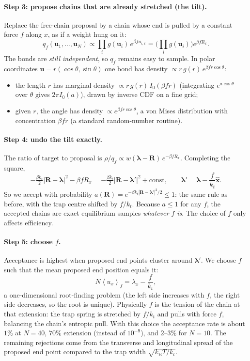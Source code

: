\documentclass[11pt,a4paper]{article}
\newcommand{\kT}{k_{\mathrm B}T}
\newcommand{\avg}[1]{\left\langle #1\right\rangle}
\newcommand{\lam}{\bm{\lambda}}
\begin{document}
\paragraph{Step 3: propose chains that are already stretched (the tilt).} Replace the free-chain proposal by a
chain whose end is pulled by a constant force $f$ along $x$, as if a weight hung on it:
\begin{equation}
q_f(\bm u_1,\dots,\bm u_N)\propto\prod_ig(\bm u_i)\,e^{\beta f u_{i,x}}=\Big(\prod_ig(\bm u_i)\Big)e^{\beta fR_x}.
\end{equation}
The bonds are \emph{still independent}, so $q_f$ remains easy to sample. In polar coordinates
$\bm u=r(\cos\theta,\sin\theta)$ one bond has density $\propto r\,g(r)\,e^{\beta fr\cos\theta}$:
\begin{itemize}[leftmargin=*,itemsep=0pt]
\item the length $r$ has marginal density $\propto r\,g(r)\,I_0(\beta fr)$ (integrating $e^{a\cos\theta}$ over
$\theta$ gives $2\pi I_0(a)$), drawn by inverse CDF on a fine grid;
\item given $r$, the angle has density $\propto e^{\beta fr\cos\theta}$, a von Mises distribution with
concentration $\beta fr$ (a standard random-number routine).
\end{itemize}

\paragraph{Step 4: undo the tilt exactly.} The ratio of target to proposal is
$\rho/q_f\propto w(\lam-\bm R)\,e^{-\beta fR_x}$. Completing the square,
\begin{equation}
-\tfrac{\beta k_t}{2}|\bm R-\lam|^2-\beta fR_x=-\tfrac{\beta k_t}{2}|\bm R-\lam'|^2+\text{const},
\qquad\lam'=\lam-\frac{f}{k_t}\hat{\bm x}.
\end{equation}
So we accept with probability $a(\bm R)=e^{-\beta k_t|\bm R-\lam'|^2/2}\le1$: the same rule as before, with the
trap centre shifted by $f/k_t$. Because $a\le1$ for any $f$, the accepted chains are exact
equilibrium samples \emph{whatever $f$ is}. The choice of $f$ only affects efficiency.

\paragraph{Step 5: choose $f$.} Acceptance is highest when proposed end points cluster around $\lam'$.
We choose $f$ such that the mean proposed end position equals it:
\begin{equation}
N\avg{u_x}_f=\lambda_x-\frac{f}{k_t},
\end{equation}
a one-dimensional root-finding problem (the left side increases with $f$, the right side decreases,
so the root is unique). Physically $f$ is the tension of the chain at that extension: the trap
spring is stretched by $f/k_t$ and pulls with force $f$, balancing the chain's entropic pull.
With this choice the acceptance rate is about $1\%$ at $N=40$, $70\%$ extension (instead of $10^{-9}$),
and $2$--$3\%$ for $N=10$. The remaining rejections come from the transverse and longitudinal spread of
the proposed end point compared to the trap width $\sqrt{\kT/k_t}$.
\end{document}
